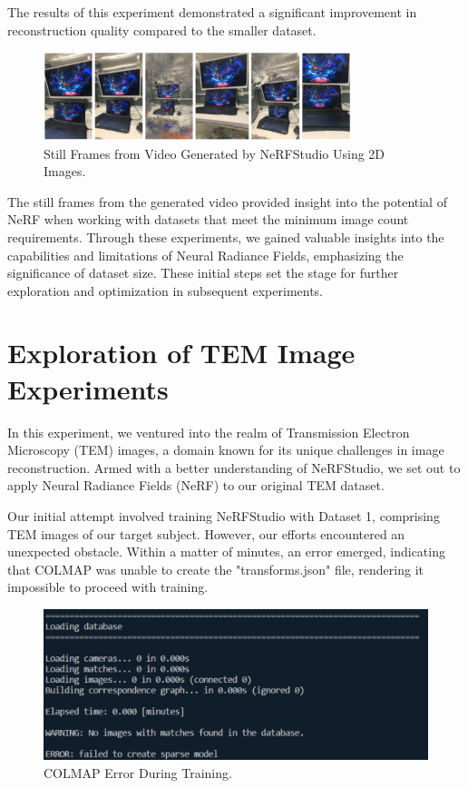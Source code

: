The results of this experiment demonstrated a significant improvement in reconstruction quality compared to the smaller dataset. 

\begin{figure}[thbp]
    \centering
    \includegraphics[width=0.8\textwidth]{img/Nerf Result.png}
    \caption{Still Frames from Video Generated by NeRFStudio Using 2D Images.}\label{fig:Still Frames from Video Generated Using 2D Images with New Camera Angle}
\end{figure}
\vspace{10pt}
The still frames from the generated video provided insight into the potential of NeRF when working with datasets that meet the minimum image count requirements. Through these experiments, we gained valuable insights into the capabilities and limitations of Neural Radiance Fields, emphasizing the significance of dataset size. These initial steps set the stage for further exploration and optimization in subsequent experiments.


\section{Exploration of TEM Image Experiments}
In this experiment, we ventured into the realm of Transmission Electron Microscopy (TEM) images, a domain known for its unique challenges in image reconstruction. Armed with a better understanding of NeRFStudio, we set out to apply Neural Radiance Fields (NeRF) to our original TEM dataset.
\vspace{10pt}

Our initial attempt involved training NeRFStudio with Dataset 1, comprising TEM images of our target subject. However, our efforts encountered an unexpected obstacle. Within a matter of minutes, an error emerged, indicating that COLMAP was unable to create the "transforms.json" file, rendering it impossible to proceed with training.

\begin{figure}[H]
    \centering
    \includegraphics[width=1\textwidth]{img/Colmap error.png}
    \caption{COLMAP Error During Training.}\label{fig:Colmap error}
\end{figure}


